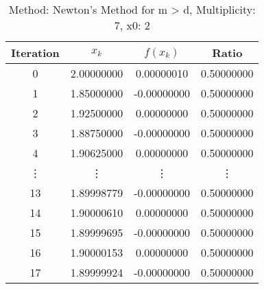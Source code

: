 \begin{table}
\centering
\caption{Method: Newton's Method for m > d, Multiplicity: 7, x0: 2}
\label{tab:table_Newton's_Method_for_m_>_d_7_2}
\begin{tabular}{c c c c}
\toprule
Iteration &      $x_k$ &    $f(x_k)$ &      Ratio \\
\midrule
        0 & 2.00000000 &  0.00000010 & 0.50000000 \\
        1 & 1.85000000 & -0.00000000 & 0.50000000 \\
        2 & 1.92500000 &  0.00000000 & 0.50000000 \\
        3 & 1.88750000 & -0.00000000 & 0.50000000 \\
        4 & 1.90625000 &  0.00000000 & 0.50000000 \\
   \vdots &     \vdots &      \vdots &     \vdots \\
       13 & 1.89998779 & -0.00000000 & 0.50000000 \\
       14 & 1.90000610 &  0.00000000 & 0.50000000 \\
       15 & 1.89999695 & -0.00000000 & 0.50000000 \\
       16 & 1.90000153 &  0.00000000 & 0.50000000 \\
       17 & 1.89999924 & -0.00000000 & 0.50000000 \\
\bottomrule
\end{tabular}
\end{table}
